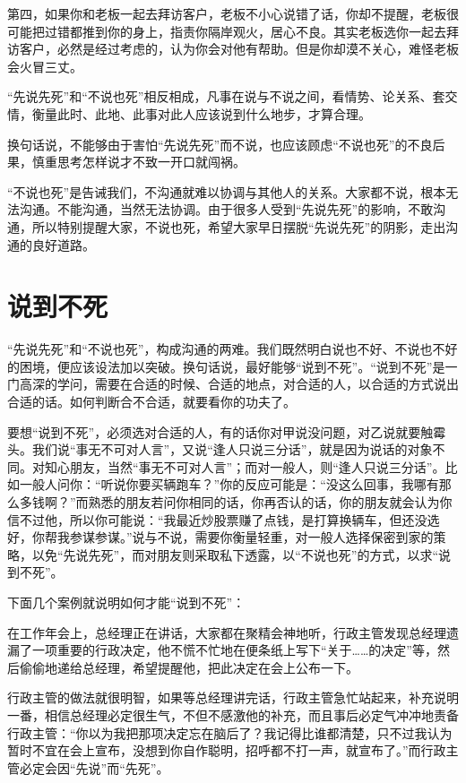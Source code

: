 \documentclass[fontset=fandol, a4paper, 12pt, openright]{ctexbook}
\begin{document}
第四，如果你和老板一起去拜访客户，老板不小心说错了话，你却不提醒，老板很可能把过错都推到你的身上，指责你隔岸观火，居心不良。其实老板选你一起去拜访客户，必然是经过考虑的，认为你会对他有帮助。但是你却漠不关心，难怪老板会火冒三丈。

“先说先死”和“不说也死”相反相成，凡事在说与不说之间，看情势、论关系、套交情，衡量此时、此地、此事对此人应该说到什么地步，才算合理。

换句话说，不能够由于害怕“先说先死”而不说，也应该顾虑“不说也死”的不良后果，慎重思考怎样说才不致一开口就闯祸。

“不说也死”是告诫我们，不沟通就难以协调与其他人的关系。大家都不说，根本无法沟通。不能沟通，当然无法协调。由于很多人受到“先说先死”的影响，不敢沟通，所以特别提醒大家，不说也死，希望大家早日摆脱“先说先死”的阴影，走出沟通的良好道路。


\section{说到不死}

“先说先死”和“不说也死”，构成沟通的两难。我们既然明白说也不好、不说也不好的困境，便应该设法加以突破。换句话说，最好能够“说到不死”。“说到不死”是一门高深的学问，需要在合适的时候、合适的地点，对合适的人，以合适的方式说出合适的话。如何判断合不合适，就要看你的功夫了。

要想“说到不死”，必须选对合适的人，有的话你对甲说没问题，对乙说就要触霉头。我们说“事无不可对人言”，又说“逢人只说三分话”，就是因为说话的对象不同。对知心朋友，当然“事无不可对人言”；而对一般人，则“逢人只说三分话”。比如一般人问你：“听说你要买辆跑车？”你的反应可能是：“没这么回事，我哪有那么多钱啊？”而熟悉的朋友若问你相同的话，你再否认的话，你的朋友就会认为你信不过他，所以你可能说：“我最近炒股票赚了点钱，是打算换辆车，但还没选好，你帮我参谋参谋。”说与不说，需要你衡量轻重，对一般人选择保密到家的策略，以免“先说先死”，而对朋友则采取私下透露，以“不说也死”的方式，以求“说到不死”。

下面几个案例就说明如何才能“说到不死”：

在工作年会上，总经理正在讲话，大家都在聚精会神地听，行政主管发现总经理遗漏了一项重要的行政决定，他不慌不忙地在便条纸上写下“关于……的决定”等，然后偷偷地递给总经理，希望提醒他，把此决定在会上公布一下。

行政主管的做法就很明智，如果等总经理讲完话，行政主管急忙站起来，补充说明一番，相信总经理必定很生气，不但不感激他的补充，而且事后必定气冲冲地责备行政主管：“你以为我把那项决定忘在脑后了？我记得比谁都清楚，只不过我认为暂时不宜在会上宣布，没想到你自作聪明，招呼都不打一声，就宣布了。”而行政主管必定会因“先说”而“先死”。
\end{document}

